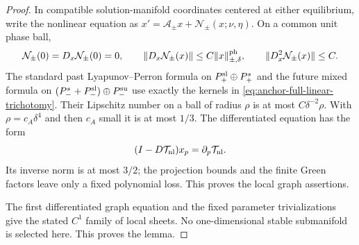 \begin{proof}
In compatible solution-manifold coordinates centered at either equilibrium,
write the nonlinear equation as
\(x'=\mathcal A_\pm x+\mathcal N_\pm(x;\nu,\eta)\).  On a common
unit phase ball,
\begin{equation}
 \mathcal N_\pm(0)=D_x\mathcal N_\pm(0)=0,
 \qquad
 \|D_x\mathcal N_\pm(x)\|\le C\|x\|_{\pm,\delta}^{\rm ph},
 \qquad \|D_x^2\mathcal N_\pm(x)\|\le C.          \label{eq:anchor-local-nonlinear-bounds}
\end{equation}
The standard past Lyapunov--Perron formula on
\(P_+^{\rm sl}\oplus P_+^s\) and the future mixed formula on
\((P_-^s+P_-^{\rm sl})\oplus P_-^{\rm su}\) use exactly the kernels in
\cref{eq:anchor-full-linear-trichotomy}.  Their Lipschitz number on a ball
of radius \(\rho\) is at most
\(C\delta^{-2}\rho\).  With
\(\rho=c_A\delta^4\) and then \(c_A\) small it is at most \(1/3\).
The differentiated equation has the form
\begin{equation}
 (I-D\mathcal T_{\rm nl})x_p
   =\partial_p\mathcal T_{\rm nl}.                  \label{eq:anchor-local-manifold-jets}
\end{equation}
Its inverse norm is at most \(3/2\); the projection bounds and the
finite Green factors leave only a fixed polynomial loss.  This proves the
local graph assertions.

The first differentiated graph equation and the fixed parameter
trivializations give the stated \(C^1\) family of local sheets.  No
one-dimensional stable submanifold is selected here.  This proves the
lemma.
\end{proof}


